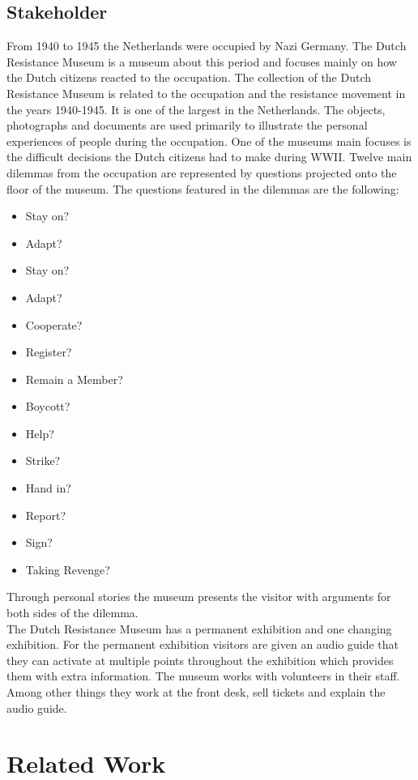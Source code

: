 \subsection{Stakeholder} \label{sec:stakeholder}
From 1940 to 1945 the Netherlands were occupied by Nazi Germany. The Dutch Resistance Museum is a museum about this period and focuses mainly on how the Dutch citizens reacted to the occupation. The collection of the Dutch Resistance Museum is related to the occupation and the resistance movement in the years 1940-1945. It is one of the largest in the Netherlands. The objects, photographs and documents are used primarily to illustrate the personal experiences of people during the occupation. One of the museums main focuses is the difficult decisions the Dutch citizens had to make during WWII. Twelve main dilemmas from the occupation are represented by questions projected onto the floor of the museum. The questions featured in the dilemmas are the following:
\begin{itemize}
\item Stay on?
\item Adapt?
\item Stay on?
\item Adapt?
\item Cooperate?
\item Register?
\item Remain a Member?
\item Boycott?
\item Help?
\item Strike?
\item Hand in?
\item Report?
\item Sign?
\item Taking Revenge?
\end{itemize}
Through personal stories the museum presents the visitor with arguments for both sides of the dilemma.\\

The Dutch Resistance Museum has a permanent exhibition and one changing exhibition. For the permanent exhibition visitors are given an audio guide that they can activate at multiple points throughout the exhibition which provides them with extra information. The museum works with volunteers in their staff. Among other things they work at the front desk, sell tickets and explain the audio guide.

\section{Related Work}\label{relwork}
